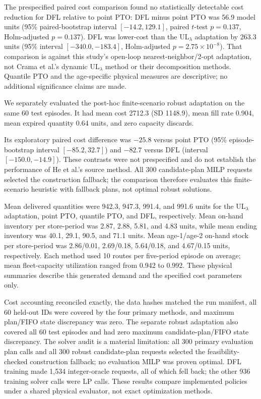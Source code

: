 \documentclass[11pt,a4paper]{article}
\begin{document}
The prespecified paired cost comparison found no statistically detectable cost reduction for DFL relative to point PTO: DFL minus point PTO was 56.9 model units (95\% paired-bootstrap interval $[-14.2,129.1]$, paired $t$-test $p=0.137$, Holm-adjusted $p=0.137$). DFL was lower-cost than the UL$_\lambda$ adaptation by 263.3 units (95\% interval $[-340.0,-183.4]$, Holm-adjusted $p=2.75\times10^{-8}$). That comparison is against this study's open-loop nearest-neighbor/2-opt adaptation, not Crama et al.'s dynamic UL$_\lambda$ method or their decomposition methods. Quantile PTO and the age-specific physical measures are descriptive; no additional significance claims are made.

We separately evaluated the post-hoc finite-scenario robust adaptation on the same 60 test episodes. It had mean cost 2712.3 (SD 1148.9), mean fill rate 0.904, mean expired quantity 0.64 units, and zero capacity discards.

Its exploratory paired cost difference was $-25.8$ versus point PTO (95\% episode-bootstrap interval $[-85.2,32.7]$) and $-82.7$ versus DFL (interval $[-150.0,-14.9]$). These contrasts were not prespecified and do not establish the performance of He et al.'s source method. All 300 candidate-plan MILP requests selected the construction fallback; the comparison therefore evaluates this finite-scenario heuristic with fallback plans, not optimal robust solutions.

Mean delivered quantities were 942.3, 947.3, 991.4, and 991.6 units for the UL$_\lambda$ adaptation, point PTO, quantile PTO, and DFL, respectively. Mean on-hand inventory per store-period was 2.87, 2.88, 5.81, and 4.83 units, while mean ending inventory was 40.1, 29.1, 90.5, and 71.1 units. Mean age-1/age-2 on-hand stock per store-period was 2.86/0.01, 2.69/0.18, 5.64/0.18, and 4.67/0.15 units, respectively. Each method used 10 routes per five-period episode on average; mean fleet-capacity utilization ranged from 0.942 to 0.992. These physical summaries describe this generated demand and the specified cost parameters only.

Cost accounting reconciled exactly, the data hashes matched the run manifest, all 60 held-out IDs were covered by the four primary methods, and maximum plan/FIFO state discrepancy was zero. The separate robust adaptation also covered all 60 test episodes and had zero maximum candidate-plan/FIFO state discrepancy. The solver audit is a material limitation: all 300 primary evaluation plan calls and all 300 robust candidate-plan requests selected the feasibility-checked construction fallback; no evaluation MILP was proven optimal. DFL training made 1,534 integer-oracle requests, all of which fell back; the other 936 training solver calls were LP calls. These results compare implemented policies under a shared physical evaluator, not exact optimization methods.
\end{document}
